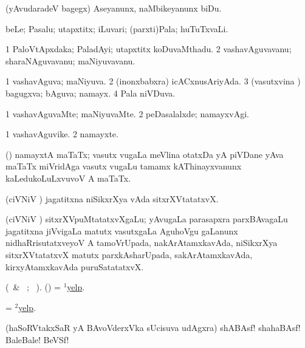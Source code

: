 (yAvudaradeV bagegx) Aseyanunx, naMbikeyanunx biDu.
\eanum
\numie
\enum
\emng
\eentry

\bentry
{} 
\gl{\nA} 
\bmng
beLe; Pasalu; utapxtitx; iLuvari; (parxti)Pala; huTuTxvaLi.
\emng
\eentry

\bentry
{} 
\gl{\nA} 
\bmng
\bnum
\num{1} PaloVtApxdaka; PaladAyi; utapxtitx koDuvaMthadu. 
\num{2} vashavAguvavanu; sharaNAguvavanu; maNiyuvavanu.
\enum
\emng
\eentry

\bentry
{} 
\gl{\gu} 
\bmng
\bnum
\num{1} vashavAguva; maNiyuva. 
\num{2} (inonxbabxra) icACxnusAriyAda. 
\num{3} (vasutxvina \vi) bagugxva; bAguva; namayx. 
\num{4} Pala niVDuva.
\enum
\emng
\eentry

\bentry
{} 
\gl{\kirxvi} 
\bmng
\bnum
\num{1} vashavAguvaMte; maNiyuvaMte. 
\num{2} peDasalalxde; namayxvAgi.
\enum
\emng
\eentry

\bentry
{} 
\gl{\nA} 
\bmng
\bnum
\num{1} vashavAguvike. 
\num{2} namayxte.
\enum
\emng
\eentry

\bentry
{}
\gl{\nA} 
\bmng
(\Bwvi) namayxtA maTaTx; vasutx \mo vugaLa meVlina otatxDa yA piVDane yAva maTaTx miVridAga vasutx \mo vugaLu tamamx kAThinayxvanunx kaLedukoLuLxvuvoV A maTaTx.
\emng
\eentry

\bentry
{} 
\gl{\nA} 
\bmng
(ciVNiV \tashA) jagatitxna niSikxrXya vAda sitxrXVtatatxvX.
\emng
\eentry

\bentry
{}
\gl{\nA}
\bmng
(ciVNiV \tashA) sitxrXVpuMtatatxvXgaLu; yAvugaLa parasapxra parxBAvagaLu jagatitxna jiVvigaLa matutx vasutxgaLa AguhoVgu gaLanunx nidhaRrisutatxveyoV A tamoVrUpada, 	nakArAtamxkavAda, niSikxrXya sitxrXVtatatxvX matutx parxkAsharUpada, sakArAtamxkavAda, kirxyAtamxkavAda puruSatatatxvX. \quad {}
\emng
\eentry

\bentry
{} 
\gl{\akirx} 
\bmng
(\BU\ \& \BUkaq\ ; \vakaq\ ). 
(\ame) = \hyperlink{yelp(1)}{$^1$yelp}.
\emng
\eentry

\bentry
{} 
\gl{\nA} 
\bmng
= \hyperlink{yelp(2)}{$^2$yelp}.
\emng
\eentry

\bentry
{} 
\gl{\BAavayx} 
\bmng
(haSoRVtakxSaR yA BAvoVderxVka sUcisuva udAgxra) shABAsf! shahaBAsf! BaleBale! BeVSf! 
\emng
\eentry

